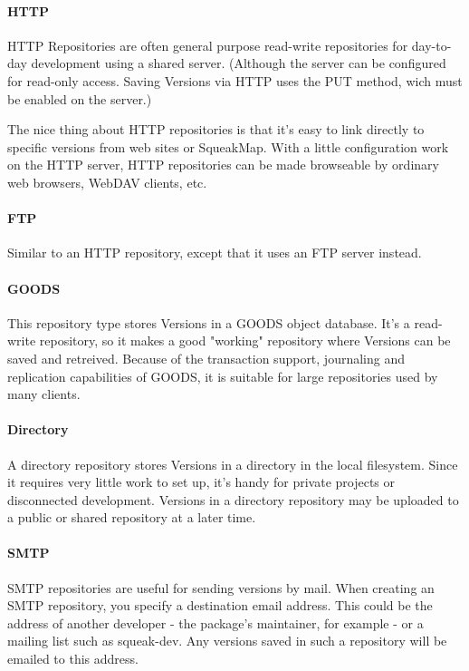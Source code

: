 \documentclass[a4paper,10pt,twoside]{book}
\begin{document}
\paragraph{HTTP} HTTP Repositories are often general purpose read-write repositories for day-to-day development using a shared server. (Although the server can be configured for read-only access. Saving Versions via HTTP uses the PUT method, wich must be enabled on the server.)

The nice thing about HTTP repositories is that it's easy to link directly to specific versions from web sites or SqueakMap. With a little configuration work on the HTTP server, HTTP repositories can be made browseable by ordinary web browsers, WebDAV clients, etc.

\paragraph{FTP} Similar to an HTTP repository, except that it uses an FTP server instead.

\paragraph{GOODS} This repository type stores Versions in a GOODS object database. It's a read-write repository, so it makes a good "working" repository where Versions can be saved and retreived. Because of the transaction support, journaling and replication capabilities of GOODS, it is suitable for large repositories used by many clients.

\paragraph{Directory} A directory repository stores Versions in a directory in the local filesystem. Since it requires very little work to set up, it's handy for private projects or disconnected development. Versions in a directory repository may be uploaded to a public or shared repository at a later time.

\paragraph{SMTP} SMTP repositories are useful for sending versions by mail. When creating an SMTP repository, you specify a destination email address. This could be the address of another developer - the package's maintainer, for example - or a mailing list such as squeak-dev. Any versions saved in such a repository will be emailed to this address.
\end{document}
